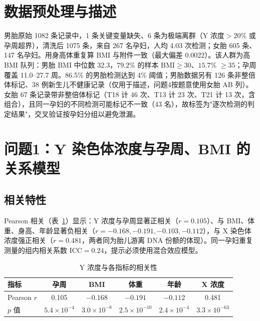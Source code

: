\documentclass[UTF8,a4paper,11pt]{ctexart}
\begin{document}
\section{数据预处理与描述}
男胎原始 1082 条记录中，1 条关键变量缺失、6 条为极端离群（Y 浓度$>20\%$ 或孕周超界），清洗后 1075 条，来自 267 名孕妇，人均 4.03 次检测；女胎 605 条、147 名孕妇。用身高体重复算 BMI 与附件一致（最大偏差 0.0022）。该人群为高 BMI 队列：男胎 BMI 中位数 32.3，$79.2\%$ 的样本 BMI$\ge30$、$15.7\%$ $\ge35$；孕周覆盖 11.0--27.7 周。86.5\% 的男胎检测达到 4\% 阈值；男胎数据另有 126 条非整倍体标记、38 例新生儿不健康记录（仅用于描述，问题4按题意使用女胎 AB 列）。女胎 67 条记录带非整倍体标记（T18 计 46 次、T13 计 23 次、T21 计 13 次，含组合），且同一孕妇的不同检测可能标记不一致（43 名），故标签为"逐次检测的判定结果"，交叉验证按孕妇分组以避免泄漏。

\section{问题1：Y 染色体浓度与孕周、BMI 的关系模型}
\subsection{相关特性}
Pearson 相关（表~\ref{tab:corr}）显示：Y 浓度与孕周显著正相关（$r=0.105$）、与 BMI、体重、身高、年龄显著负相关（$r=-0.168,-0.191,-0.103,-0.112$），与 X 染色体浓度强正相关（$r=0.481$，两者同为胎儿游离 DNA 份额的体现）。同一孕妇重复测量的组内相关系数 ICC$=0.24$，提示必须使用混合效应模型。

\begin{table}[H]\centering\small
\caption{Y 浓度与各指标的相关性}\label{tab:corr}
\begin{tabular}{lccccc}
\toprule
指标 & 孕周 & BMI & 体重 & 年龄 & X 浓度\\
\midrule
Pearson $r$ & 0.105 & $-0.168$ & $-0.191$ & $-0.112$ & 0.481\\
$p$ 值 & $5.4\times10^{-4}$ & $3.0\times10^{-8}$ & $2.5\times10^{-10}$ & $2.4\times10^{-4}$ & $3.3\times10^{-63}$\\
\bottomrule
\end{tabular}
\end{table}
\end{document}
